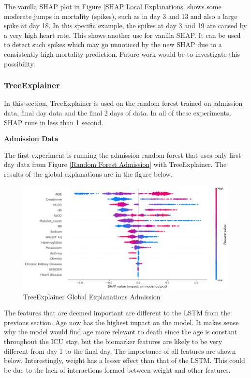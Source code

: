 \documentclass[12pt]{article}
\begin{document}
The vanilla SHAP plot in Figure \ref{SHAP Local Explanations} shows some moderate jumps in mortality (spikes), such as in day 3 and 13 and also a large spike at day 18. In this specific example, the spikes at day 3 and 19 are caused by a very high heart rate. This shows another use for vanilla SHAP. It can be used to detect such spikes which may go unnoticed by the new SHAP due to a consistently high mortality prediction. Future work would be to investigate this possibility. 


\subsubsection{TreeExplainer}

In this section, TreeExplainer is used on the random forest trained on admission data, final day data and the final 2 days of data. In all of these experiments, SHAP runs in less than 1 second.

\textbf{Admission Data}

The first experiment is running the admission random forest that uses only first day data from Figure \ref{Random Forest Admission} with TreeExplainer. The results of the global explanations are in the figure below.

\begin{figure}[H]
\centering\caption{TreeExplainer Global Explanations Admission}
\includegraphics[scale=0.5]{TreeExplainer Admission1 Global.png}
\end{figure}
The features that are deemed important are different to the LSTM from the previous section. Age now has the highest impact on the model. It makes sense why the model would find age more relevant to death since the age is constant throughout the ICU stay, but the biomarker features are likely to be very different from day 1 to the final day. The importance of all features are shown below. Interestingly, weight has a lesser effect than that of the LSTM. This could be due to the lack of interactions formed between weight and other features.
\end{document}
